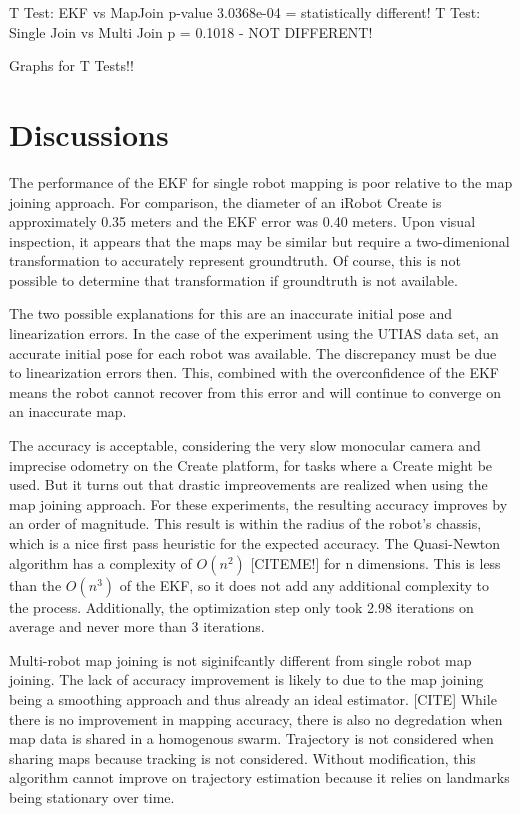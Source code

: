 \documentclass[12pt]{report}
\begin{document}
T Test: EKF vs MapJoin
p-value 3.0368e-04  = statistically different!
T Test: Single Join vs Multi Join  p = 0.1018 - NOT DIFFERENT!

Graphs for T Tests!!

\chapter{Discussions}

	The performance of the EKF for single robot mapping is poor relative to the map joining approach.  For comparison, the diameter of an iRobot Create is approximately 0.35 meters and the EKF error was 0.40 meters.  Upon visual inspection, it appears that the maps may be similar but require a two-dimenional transformation to accurately represent groundtruth.  Of course, this is not possible to determine that transformation if groundtruth is not available.

	The two possible explanations for this are an inaccurate initial pose and linearization errors.  In the case of the experiment using the UTIAS data set, an accurate initial pose for each robot was available.  The discrepancy must be due to linearization errors then.  This, combined with the overconfidence of the EKF means the robot cannot recover from this error and will continue to converge on an inaccurate map.  

	The accuracy is acceptable, considering the very slow monocular camera and imprecise odometry on the Create platform, for tasks where a Create might be used.  But it turns out that drastic impreovements are realized when using the map joining approach.  For these experiments, the resulting accuracy improves by an order of magnitude.  This result is within the radius of the robot's chassis, which is a nice first pass heuristic for the expected accuracy.  The Quasi-Newton algorithm has a complexity of $O(n^2)$ [CITEME!] for n dimensions.   This is less than the $O(n^3)$ of the EKF, so it does not add any additional complexity to the process.  Additionally, the optimization step only took 2.98 iterations on average and never more than 3 iterations.  

	Multi-robot map joining is not siginifcantly different from single robot map joining.  The lack of accuracy improvement is likely to due to the map joining being a smoothing approach and thus already an ideal estimator.  [CITE]  While there is no improvement in mapping accuracy, there is also no degredation when map data is shared in a homogenous swarm.  Trajectory is not considered when sharing maps because tracking is not considered.  Without modification, this algorithm cannot improve on trajectory estimation because it relies on landmarks being stationary over time.
\end{document}

